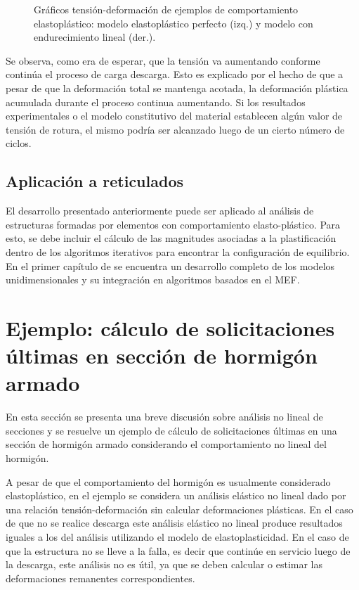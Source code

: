 \begin{figure}[htb]
	\centering
	\resizebox{.48\linewidth}{!}{}
	\resizebox{.48\linewidth}{!}{}
	\caption{Gráficos tensión-deformación de ejemplos de comportamiento elastoplástico: modelo elastoplástico perfecto (izq.) y modelo con endurecimiento lineal (der.).}
	\label{fig:grafsplast}
\end{figure}

Se observa, como era de esperar, que la tensión va aumentando conforme continúa el proceso de carga descarga. %
%
Esto es explicado por el hecho de que a pesar de que la deformación total se mantenga acotada, la deformación plástica acumulada durante el proceso continua aumentando. %
%
Si los resultados experimentales o el modelo constitutivo del material establecen algún valor de tensión de rotura, el mismo podría ser alcanzado luego de un cierto número de ciclos.

\subsection{Aplicación a reticulados}

El desarrollo presentado anteriormente puede ser aplicado al análisis de estructuras formadas por elementos con comportamiento elasto-plástico. %
%
Para esto, se debe incluir el cálculo de las magnitudes asociadas a la plastificación dentro de los algoritmos iterativos para encontrar la configuración de equilibrio. %
%
En el primer capítulo de \citep{Simo1998} se encuentra un desarrollo completo de los modelos unidimensionales y su integración en algoritmos basados en el MEF.

\section[Solicitaciones últimas en sección de hormigón armado] {Ejemplo: cálculo de solicitaciones últimas en sección de hormigón armado} 
%

En esta sección se presenta una breve discusión sobre análisis no lineal de secciones y se resuelve un ejemplo de cálculo de solicitaciones últimas en una sección de hormigón armado considerando el comportamiento no lineal del hormigón. %

A pesar de que el comportamiento del hormigón es usualmente considerado elastoplástico, en el ejemplo se considera un análisis elástico no lineal dado por una relación tensión-deformación sin calcular deformaciones plásticas. %
%
En el caso de que no se realice descarga este análisis elástico no lineal produce resultados iguales a los del análisis utilizando el modelo de elastoplasticidad. %
%
En el caso de que la estructura no se lleve a la falla, es decir que continúe en servicio luego de la descarga, este análisis no es útil, ya que se deben calcular o estimar las deformaciones remanentes correspondientes.


